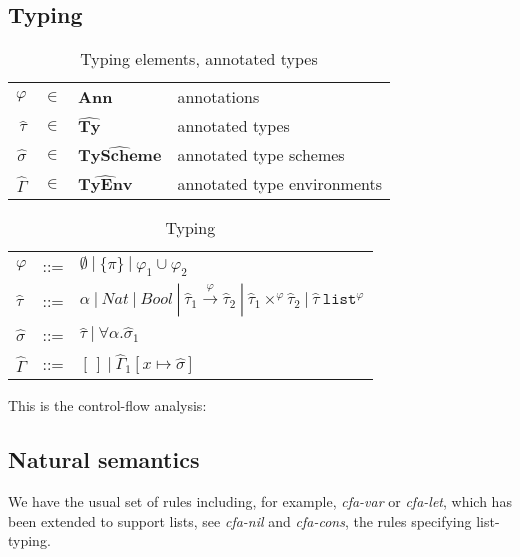 \documentclass[a4paper]{article}
\begin{document}
\subsection{Typing}

\begin{table}
    \centering
    \begin{tabular}{rcll}
        $\varphi$ &               $\in$ & \textbf{Ann}                   & annotations \\ 
        $\widehat{\tau}$&         $\in$ & $\widehat{\textbf{Ty}      } $ & annotated types \\
        $\widehat{\sigma} $&      $\in$ & $\widehat{\textbf{TyScheme}} $ & annotated type schemes\\
        $\widehat{\Gamma}$&       $\in$ & $\widehat{\textbf{TyEnv}   } $ & annotated type environments  \\
    \end{tabular}
    \caption{Typing elements, annotated types}
    \label{tab:typingelems}
\end{table}
\begin{table}
    \centering
    \begin{tabular}{lcl}
        $ \varphi$         & ::= & $ \emptyset \:|\: \{\pi\} \:|\: \varphi_1 \cup \varphi_2 $ \\
        $\widehat{\tau}$   & ::= & $\alpha \:|\: Nat \: | \: Bool \: | \: \widehat{\tau}_1 \stackrel{\varphi}{\rightarrow} \widehat{\tau}_2 \:|\: \widehat{\tau}_1 \times^\varphi \widehat{\tau}_2 \:|\: \widehat{\tau}~\texttt{list}^\varphi   $ \\ 
        $\widehat{\sigma}$ & ::= & $\widehat{\tau} \:|\: \forall \alpha. \widehat{\sigma}_1 $ \\ 
        $\widehat{\Gamma}$ & ::= & $[\,] \:|\: \widehat{\Gamma}_1[x \mapsto \widehat{\sigma}] $ \\
    \end{tabular}
    \caption{Typing}
    \label{tab:typing}
\end{table}

This is the control-flow analysis: 

\subsection{Natural semantics}

We have the usual set of rules including, for example,  \emph{cfa-var} or \emph{cfa-let}, which has been extended to support lists, see \emph{cfa-nil} and \emph{cfa-cons}, the rules specifying list-typing. 
\end{document}
